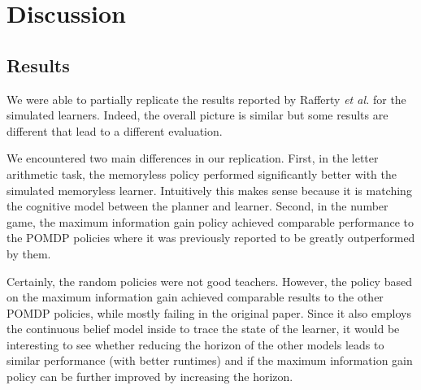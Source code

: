 
\section{Discussion}

\subsection{Results}
We were able to partially replicate the results reported by Rafferty \textit{et al.} for the simulated learners.
Indeed, the overall picture is similar but some results are different that lead to a different evaluation.

We encountered two main differences in our replication. First, in the letter arithmetic task, the memoryless policy performed significantly better with the simulated memoryless learner. Intuitively this makes sense because it is matching the cognitive model between the planner and learner.
Second, in the number game, the maximum information gain policy achieved comparable performance to the POMDP policies where it was previously reported to be greatly outperformed by them.


Certainly, the random policies were not good teachers.
However, the policy based on the maximum information gain achieved comparable results to the other POMDP policies, while mostly failing in the original paper. 
Since it also employs the continuous belief model inside to trace the state of the learner, it would be interesting to see whether reducing the horizon of the other models leads to similar performance (with better runtimes) and if the maximum information gain policy can be further improved by increasing the horizon.



